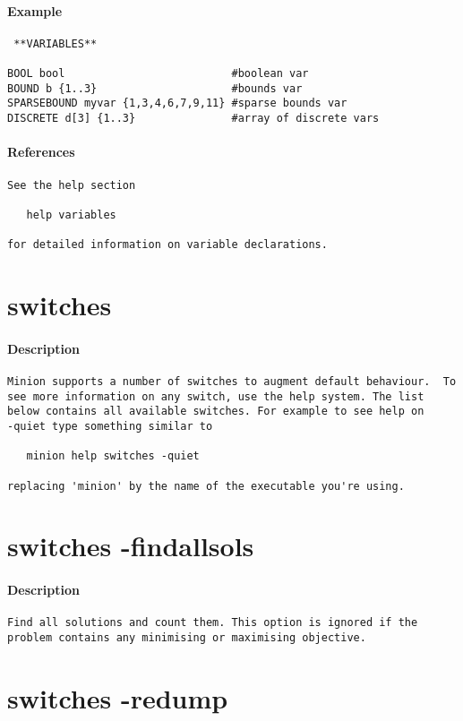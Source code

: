 \paragraph{Example}
{\footnotesize
\begin{verbatim}
 **VARIABLES**

BOOL bool                          #boolean var
BOUND b {1..3}                     #bounds var
SPARSEBOUND myvar {1,3,4,6,7,9,11} #sparse bounds var
DISCRETE d[3] {1..3}               #array of discrete vars
\end{verbatim}
}
\paragraph{References}
{\footnotesize
\begin{verbatim}
See the help section

   help variables

for detailed information on variable declarations.
\end{verbatim}
}
\section{switches}
\paragraph{Description}
{\footnotesize
\begin{verbatim}
Minion supports a number of switches to augment default behaviour.  To
see more information on any switch, use the help system. The list
below contains all available switches. For example to see help on
-quiet type something similar to

   minion help switches -quiet

replacing 'minion' by the name of the executable you're using.
\end{verbatim}
}
\section{switches -findallsols}
\paragraph{Description}
{\footnotesize
\begin{verbatim}
Find all solutions and count them. This option is ignored if the
problem contains any minimising or maximising objective.
\end{verbatim}
}
\section{switches -redump}
